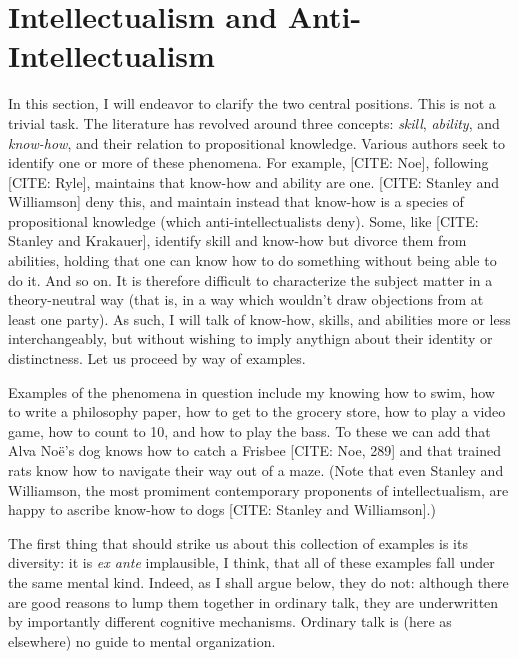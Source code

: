 \section{Intellectualism and Anti-Intellectualism}

In this section, I will endeavor to clarify the two central positions.
This is not a trivial task.
The literature has revolved around three concepts: \emph{skill}, \emph{ability}, and \emph{know-how}, and their relation to propositional knowledge.
Various authors seek to identify one or more of these phenomena.
For example, [CITE: Noe], following [CITE: Ryle], maintains that know-how and ability are one.
[CITE: Stanley and Williamson] deny this, and maintain instead that know-how is a species of propositional knowledge (which anti-intellectualists deny).
Some, like [CITE: Stanley and Krakauer], identify skill and know-how but divorce them from abilities, holding that one can know how to do something without being able to do it.
And so on.
It is therefore difficult to characterize the subject matter in a theory-neutral way (that is, in a way which wouldn't draw objections from at least one party).
As such, I will talk of know-how, skills, and abilities more or less interchangeably, but without wishing to imply anythign about their identity or distinctness. 
Let us proceed by way of examples.

Examples of the phenomena in question include my knowing how to swim, how to write a philosophy paper, how to get to the grocery store, how to play a video game, how to count to 10, and how to play the bass.
To these we can add that Alva No\"e's dog knows how to catch a Frisbee [CITE: Noe, 289] and that trained rats know how to navigate their way out of a maze.
(Note that even Stanley and Williamson, the most promiment contemporary proponents of intellectualism, are happy to ascribe know-how to dogs [CITE: Stanley and Williamson].)

The first thing that should strike us about this collection of examples is its diversity: it is \emph{ex ante} implausible, I think, that all of these examples fall under the same mental kind.
Indeed, as I shall argue below, they do not: although there are good reasons to lump them together in ordinary talk, they are underwritten by importantly different cognitive mechanisms.
Ordinary talk is (here as elsewhere) no guide to mental organization.

